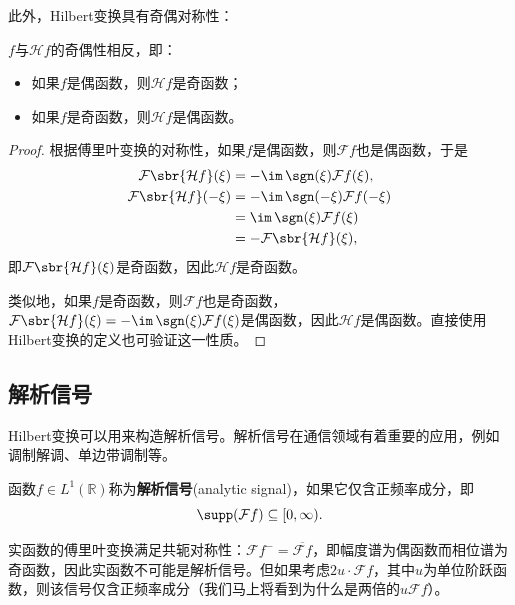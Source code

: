 此外，Hilbert变换具有奇偶对称性：
\begin{theorem}
    $f$与$\mathcal{H}f$的奇偶性相反，即：
    \begin{itemize}
        \item 如果$f$是偶函数，则$\mathcal{H}f$是奇函数；
        \item 如果$f$是奇函数，则$\mathcal{H}f$是偶函数。
    \end{itemize}
\end{theorem}
\begin{proof}
    根据傅里叶变换的对称性，如果$f$是偶函数，则$\mathcal{F}f$也是偶函数，于是
    \begin{align}
        \mathcal{F}\sbr{\mathcal{H}f}(\xi)&=-\im\,\sgn(\xi)\mathcal{F}f(\xi),\\
        \mathcal{F}\sbr{\mathcal{H}f}(-\xi)&=-\im\,\sgn(-\xi)\mathcal{F}f(-\xi)\nonumber\\
        &=\im\,\sgn(\xi)\mathcal{F}f(\xi)\nonumber\\
        &=-\mathcal{F}\sbr{\mathcal{H}f}(\xi),
    \end{align}
    即$\mathcal{F}\sbr{\mathcal{H}f}(\xi)$是奇函数，因此$\mathcal{H}f$是奇函数。

    类似地，如果$f$是奇函数，则$\mathcal{F}f$也是奇函数，$\mathcal{F}\sbr{\mathcal{H}f}(\xi)=-\im\,\sgn(\xi)\mathcal{F}f(\xi)$是偶函数，因此$\mathcal{H}f$是偶函数。直接使用Hilbert变换的定义也可验证这一性质。
\end{proof}

\subsection{解析信号}\label{sub:analytic_signal}

Hilbert变换可以用来构造解析信号。解析信号在通信领域有着重要的应用，例如调制解调、单边带调制等。
\begin{definition}[解析信号]
    函数$f\in L^1(\mathbb{R})$称为\textbf{解析信号}(analytic signal)，如果它仅含正频率成分，即
    \begin{equation}
        \supp(\mathcal{F}f)\subseteq[0,\infty).
    \end{equation}
\end{definition}

实函数的傅里叶变换满足共轭对称性：$\mathcal{F}f^-=\overline{\mathcal{F}f}$，即幅度谱为偶函数而相位谱为奇函数，因此实函数不可能是解析信号。但如果考虑$2u\cdot\mathcal{F}f$，其中$u$为单位阶跃函数，则该信号仅含正频率成分（我们马上将看到为什么是两倍的$u\mathcal{F}f$）。

